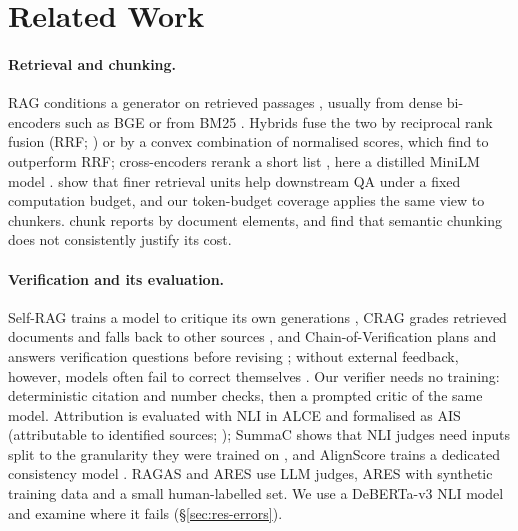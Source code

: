 \section{Related Work}
\label{sec:related}

\paragraph{Retrieval and chunking.}
RAG conditions a generator on retrieved passages \citep{lewis2020rag}, usually from dense bi-encoders \citep{karpukhin2020dpr} such as BGE \citep{xiao2024cpack} or from BM25 \citep{robertson2009bm25}.
Hybrids fuse the two by reciprocal rank fusion (RRF; \citealp{cormack2009rrf}) or by a convex combination of normalised scores, which \citet{bruch2023fusion} find to outperform RRF; cross-encoders rerank a short list \citep{nogueira2019bert}, here a distilled MiniLM model \citep{wang2020minilm}.
\citet{chen2024densex} show that finer retrieval units help downstream QA under a fixed computation budget, and our token-budget coverage applies the same view to chunkers. \citet{jimeno2024chunking} chunk reports by document elements, and \citet{qu2024semantic} find that semantic chunking does not consistently justify its cost.

\paragraph{Verification and its evaluation.}
Self-RAG trains a model to critique its own generations \citep{asai2024selfrag}, CRAG grades retrieved documents and falls back to other sources \citep{yan2024crag}, and Chain-of-Verification plans and answers verification questions before revising \citep{dhuliawala2024cove}; without external feedback, however, models often fail to correct themselves \citep{huang2024selfcorrect}.
Our verifier needs no training: deterministic citation and number checks, then a prompted critic of the same model.
Attribution is evaluated with NLI in ALCE \citep{gao2023alce} and formalised as AIS (attributable to identified sources; \citealp{rashkin2023ais}); SummaC shows that NLI judges need inputs split to the granularity they were trained on \citep{laban2022summac}, and AlignScore trains a dedicated consistency model \citep{zha2023alignscore}. RAGAS \citep{es2024ragas} and ARES \citep{saadfalcon2024ares} use LLM judges, ARES with synthetic training data and a small human-labelled set. We use a DeBERTa-v3 NLI model \citep{he2021debertav3} and examine where it fails (\S\ref{sec:res-errors}).

